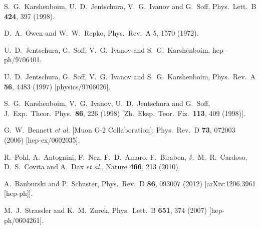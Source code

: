   S.~G.~Karshenboim, U.~D.~Jentschura, V.~G.~Ivanov and G.~Soff,
  Phys.\ Lett.\ B {\bf 424}, 397 (1998).


  D.~A.~Owen and W.~W.~Repko, 
  Phys.\ Rev.\ A 5, 1570 (1972).                 


  U.~D.~Jentschura, G.~Soff, V.~G.~Ivanov and S.~G.~Karshenboim,
  hep-ph/9706401.

  U.~D.~Jentschura, G.~Soff, V.~G.~Ivanov and S.~G.~Karshenboim,
  Phys.\ Rev.\ A {\bf 56}, 4483 (1997)
  [physics/9706026].


  S.~G.~Karshenboim, V.~G.~Ivanov, U.~D.~Jentschura and G.~Soff,
  J.\ Exp.\ Theor.\ Phys.\  {\bf 86}, 226 (1998)
  [Zh.\ Eksp.\ Teor.\ Fiz.\  {\bf 113}, 409 (1998)].


  G.~W.~Bennett {\it et al.}  [Muon G-2 Collaboration],
  Phys.\ Rev.\ D {\bf 73}, 072003 (2006)
  [hep-ex/0602035].



  R.~Pohl, A.~Antognini, F.~Nez, F.~D.~Amaro, F.~Biraben, J.~M.~R.~Cardoso, D.~S.~Covita and A.~Dax {\it et al.},
  Nature {\bf 466}, 213 (2010).

  A.~Banburski and P.~Schuster,
  Phys.\ Rev.\ D {\bf 86}, 093007 (2012)
  [arXiv:1206.3961 [hep-ph]].



  M.~J.~Strassler and K.~M.~Zurek,
  Phys.\ Lett.\ B {\bf 651}, 374 (2007)
  [hep-ph/0604261].
  





